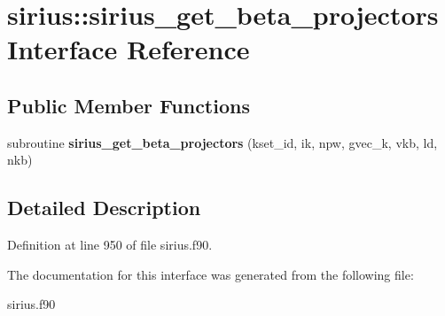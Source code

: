 \hypertarget{interfacesirius_1_1sirius__get__beta__projectors}{}\section{sirius\+:\+:sirius\+\_\+get\+\_\+beta\+\_\+projectors Interface Reference}
\label{interfacesirius_1_1sirius__get__beta__projectors}
\subsection*{Public Member Functions}
\begin{DoxyCompactItemize}
\item 
\hypertarget{interfacesirius_1_1sirius__get__beta__projectors_a9ed4ddc83bbba745b0aa116ba85a1a79}{}subroutine {\bfseries sirius\+\_\+get\+\_\+beta\+\_\+projectors} (kset\+\_\+id, ik, npw, gvec\+\_\+k, vkb, ld, nkb)\label{interfacesirius_1_1sirius__get__beta__projectors_a9ed4ddc83bbba745b0aa116ba85a1a79}

\end{DoxyCompactItemize}


\subsection{Detailed Description}


Definition at line 950 of file sirius.\+f90.



The documentation for this interface was generated from the following file\+:\begin{DoxyCompactItemize}
\item 
sirius.\+f90\end{DoxyCompactItemize}
